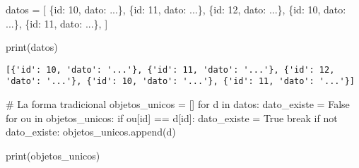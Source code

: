\documentclass[
  letterpaper,
  DIV=11,
  numbers=noendperiod]{scrreprt}
\newenvironment{Shaded}{\begin{snugshade}}{\end{snugshade}}
\newcommand{\BuiltInTok}[1]{\textcolor[rgb]{0.00,0.23,0.31}{#1}}
\newcommand{\CommentTok}[1]{\textcolor[rgb]{0.37,0.37,0.37}{#1}}
\newcommand{\ControlFlowTok}[1]{\textcolor[rgb]{0.00,0.23,0.31}{#1}}
\newcommand{\DecValTok}[1]{\textcolor[rgb]{0.68,0.00,0.00}{#1}}
\newcommand{\KeywordTok}[1]{\textcolor[rgb]{0.00,0.23,0.31}{#1}}
\newcommand{\NormalTok}[1]{\textcolor[rgb]{0.00,0.23,0.31}{#1}}
\newcommand{\OperatorTok}[1]{\textcolor[rgb]{0.37,0.37,0.37}{#1}}
\newcommand{\StringTok}[1]{\textcolor[rgb]{0.13,0.47,0.30}{#1}}
\newcommand{\VariableTok}[1]{\textcolor[rgb]{0.07,0.07,0.07}{#1}}
\begin{document}
\begin{Shaded}
\begin{Highlighting}[]
\NormalTok{datos }\OperatorTok{=}\NormalTok{ [}
\NormalTok{  \{}\StringTok{\textquotesingle{}id\textquotesingle{}}\NormalTok{: }\DecValTok{10}\NormalTok{, }\StringTok{\textquotesingle{}dato\textquotesingle{}}\NormalTok{: }\StringTok{\textquotesingle{}...\textquotesingle{}}\NormalTok{\},}
\NormalTok{  \{}\StringTok{\textquotesingle{}id\textquotesingle{}}\NormalTok{: }\DecValTok{11}\NormalTok{, }\StringTok{\textquotesingle{}dato\textquotesingle{}}\NormalTok{: }\StringTok{\textquotesingle{}...\textquotesingle{}}\NormalTok{\},}
\NormalTok{  \{}\StringTok{\textquotesingle{}id\textquotesingle{}}\NormalTok{: }\DecValTok{12}\NormalTok{, }\StringTok{\textquotesingle{}dato\textquotesingle{}}\NormalTok{: }\StringTok{\textquotesingle{}...\textquotesingle{}}\NormalTok{\},}
\NormalTok{  \{}\StringTok{\textquotesingle{}id\textquotesingle{}}\NormalTok{: }\DecValTok{10}\NormalTok{, }\StringTok{\textquotesingle{}dato\textquotesingle{}}\NormalTok{: }\StringTok{\textquotesingle{}...\textquotesingle{}}\NormalTok{\},}
\NormalTok{  \{}\StringTok{\textquotesingle{}id\textquotesingle{}}\NormalTok{: }\DecValTok{11}\NormalTok{, }\StringTok{\textquotesingle{}dato\textquotesingle{}}\NormalTok{: }\StringTok{\textquotesingle{}...\textquotesingle{}}\NormalTok{\},}
\NormalTok{]}

\BuiltInTok{print}\NormalTok{(datos)}
\end{Highlighting}
\end{Shaded}

\begin{verbatim}
[{'id': 10, 'dato': '...'}, {'id': 11, 'dato': '...'}, {'id': 12, 'dato': '...'}, {'id': 10, 'dato': '...'}, {'id': 11, 'dato': '...'}]
\end{verbatim}

\begin{Shaded}
\begin{Highlighting}[]
\CommentTok{\# La forma tradicional}
\NormalTok{objetos\_unicos }\OperatorTok{=}\NormalTok{ []}
\ControlFlowTok{for}\NormalTok{ d }\KeywordTok{in}\NormalTok{ datos:}
\NormalTok{    dato\_existe }\OperatorTok{=} \VariableTok{False}
    \ControlFlowTok{for}\NormalTok{ ou }\KeywordTok{in}\NormalTok{ objetos\_unicos:}
        \ControlFlowTok{if}\NormalTok{ ou[}\StringTok{\textquotesingle{}id\textquotesingle{}}\NormalTok{] }\OperatorTok{==}\NormalTok{ d[}\StringTok{\textquotesingle{}id\textquotesingle{}}\NormalTok{]:}
\NormalTok{          dato\_existe }\OperatorTok{=} \VariableTok{True}
          \ControlFlowTok{break}
    \ControlFlowTok{if} \KeywordTok{not}\NormalTok{ dato\_existe:}
\NormalTok{        objetos\_unicos.append(d)}
        
\BuiltInTok{print}\NormalTok{(objetos\_unicos)}
\end{Highlighting}
\end{Shaded}
\end{document}

